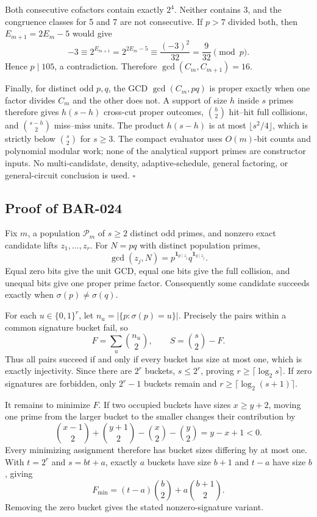 \documentclass[11pt]{article}
\begin{document}
Both consecutive cofactors contain exactly \(2^4\). Neither contains 3, and
the congruence classes for 5 and 7 are not consecutive. If \(p>7\) divided
both, then \(E_{m+1}=2E_m-5\) would give
\[
-3\equiv2^{E_{m+1}}
=2^{2E_m-5}\equiv\frac{(-3)^2}{32}=\frac9{32}\pmod p.
\]
Hence \(p\mid105\), a contradiction. Therefore
\(\gcd(C_m,C_{m+1})=16\).

Finally, for distinct odd \(p,q\), the GCD \(\gcd(C_m,pq)\) is proper
exactly when one factor divides \(C_m\) and the other does not. A support of
size \(h\) inside \(s\) primes therefore gives \(h(s-h)\) cross-cut proper
outcomes, \(\binom h2\) hit--hit full collisions, and
\(\binom{s-h}{2}\) miss--miss units. The product \(h(s-h)\) is at most
\(\lfloor s^2/4\rfloor\), which is strictly below \(\binom{s}{2}\) for
\(s\ge3\). The compact evaluator uses \(O(m)\)-bit counts and polynomial
modular work; none of the analytical support primes are constructor inputs.
No multi-candidate, density, adaptive-schedule, general factoring, or
general-circuit conclusion is used. \(\square\)

\subsection{Proof of BAR-024}\label{proof:BAR-024}

Fix \(m\), a population \(\mathcal P_m\) of \(s\ge2\) distinct odd primes,
and nonzero exact candidate lifts \(z_1,\ldots,z_r\). For
\(N=pq\) with distinct population primes,
\[
\gcd(z_j,N)
=p^{\mathbf1_{p\mid z_j}}q^{\mathbf1_{q\mid z_j}}.
\]
Equal zero bits give the unit GCD, equal one bits give the full collision,
and unequal bits give one proper prime factor. Consequently some candidate
succeeds exactly when \(\sigma(p)\ne\sigma(q)\).

For each \(u\in\{0,1\}^r\), let
\(n_u=|\{p:\sigma(p)=u\}|\). Precisely the pairs within a common signature
bucket fail, so
\[
F=\sum_u\binom{n_u}{2},\qquad
S=\binom s2-F.
\]
Thus all pairs succeed if and only if every bucket has size at most one,
which is exactly injectivity. Since there are \(2^r\) buckets,
\(s\le2^r\), proving \(r\ge\lceil\log_2s\rceil\). If zero signatures are
forbidden, only \(2^r-1\) buckets remain and
\(r\ge\lceil\log_2(s+1)\rceil\).

It remains to minimize \(F\). If two occupied buckets have sizes
\(x\ge y+2\), moving one prime from the larger bucket to the smaller changes
their contribution by
\[
\binom{x-1}{2}+\binom{y+1}{2}
-\binom x2-\binom y2=y-x+1<0.
\]
Every minimizing assignment therefore has bucket sizes differing by at most
one. With \(t=2^r\) and \(s=bt+a\), exactly \(a\) buckets have size \(b+1\)
and \(t-a\) have size \(b\), giving
\[
F_{\min}=(t-a)\binom b2+a\binom{b+1}{2}.
\]
Removing the zero bucket gives the stated nonzero-signature variant.
\end{document}
